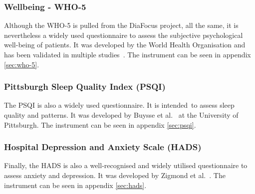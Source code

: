 \subsubsection*{Wellbeing - WHO-5}
Although the WHO-5 is pulled from the DiaFocus project, all the same, it is nevertheless a widely used questionnaire to assess the subjective psychological well-being of patients. It was developed by the World Health Organisation and has been validated in multiple studies~\cite{WHO5}. The instrument can be seen in appendix \autoref{sec:who-5}.

\subsubsection*{Pittsburgh Sleep Quality Index (PSQI)}
The PSQI is also a widely used questionnaire. It is intended to assess sleep quality and patterns. It was developed by Buysse et al.~\cite{PSQI} at the University of Pittsburgh. The instrument can be seen in appendix \autoref{sec:psqi}.

\subsubsection*{Hospital Depression and Anxiety Scale (HADS)}
Finally, the HADS is also a well-recognised and widely utilised questionnaire to assess anxiety and depression. It was developed by Zigmond et al.~\cite{HADS}. The instrument can be seen in appendix \autoref{sec:hads}.


